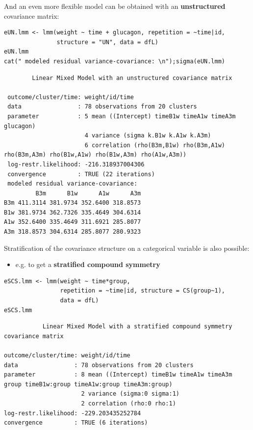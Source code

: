 \documentclass[12pt]{article}
\begin{document}
\clearpage

\noindent And an even more flexible model can be obtained with an
\textbf{unstructured} covariance matrix:

\lstset{language=r,label= ,caption= ,captionpos=b,numbers=none}
\begin{lstlisting}
eUN.lmm <- lmm(weight ~ time + glucagon, repetition = ~time|id,
               structure = "UN", data = dfL)
eUN.lmm
cat(" modeled residual variance-covariance: \n");sigma(eUN.lmm)
\end{lstlisting}

\begin{verbatim}
		Linear Mixed Model with an unstructured covariance matrix 

 outcome/cluster/time: weight/id/time 
 data                : 78 observations from 20 clusters 
 parameter           : 5 mean ((Intercept) timeB1w timeA1w timeA3m glucagon) 
                       4 variance (sigma k.B1w k.A1w k.A3m) 
                       6 correlation (rho(B3m,B1w) rho(B3m,A1w) rho(B3m,A3m) rho(B1w,A1w) rho(B1w,A3m) rho(A1w,A3m)) 
 log-restr.likelihood: -216.318937004306 
 convergence         : TRUE (22 iterations)
 modeled residual variance-covariance: 
         B3m      B1w      A1w      A3m
B3m 411.3114 381.9734 352.6400 318.8573
B1w 381.9734 362.7326 335.4649 304.6314
A1w 352.6400 335.4649 311.6921 285.8077
A3m 318.8573 304.6314 285.8077 280.9323
\end{verbatim}

\noindent Stratification of the covariance structure on a categorical
variable is also possible:
\begin{itemize}
\item e.g. to get a \textbf{stratified compound symmetry}
\end{itemize}
\lstset{language=r,label= ,caption= ,captionpos=b,numbers=none}
\begin{lstlisting}
eSCS.lmm <- lmm(weight ~ time*group,
                repetition = ~time|id, structure = CS(group~1),
                data = dfL)
eSCS.lmm
\end{lstlisting}

\begin{verbatim}
	       Linear Mixed Model with a stratified compound symmetry covariance matrix 

outcome/cluster/time: weight/id/time 
data                : 78 observations from 20 clusters 
parameter           : 8 mean ((Intercept) timeB1w timeA1w timeA3m group timeB1w:group timeA1w:group timeA3m:group) 
                      2 variance (sigma:0 sigma:1) 
                      2 correlation (rho:0 rho:1) 
log-restr.likelihood: -229.203435252784 
convergence         : TRUE (6 iterations)
\end{verbatim}
\end{document}
